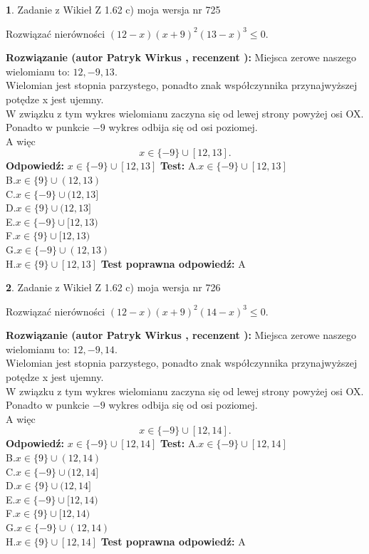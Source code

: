 \documentclass[12pt, a4paper]{article}
\theoremstyle{definition} %
\newtheorem{zad}{}
\newcommand{\zadStart}[1]{\begin{zad}#1\newline}
\newcommand{\zadStop}{\end{zad}}
\newcommand{\rozwStart}[2]{\noindent \textbf{Rozwiązanie (autor #1 , recenzent #2): }\newline}
\newcommand{\rozwStop}{\newline}
\newcommand{\odpStart}{\noindent \textbf{Odpowiedź:}\newline}
\newcommand{\odpStop}{\newline}
\newcommand{\testStart}{\noindent \textbf{Test:}\newline}
\newcommand{\testStop}{\newline}
\newcommand{\kluczStart}{\noindent \textbf{Test poprawna odpowiedź:}\newline}
\newcommand{\kluczStop}{\newline}
\begin{document}
\zadStart{Zadanie z Wikieł Z 1.62 c) moja wersja nr 725}

Rozwiązać nierówności $(12-x)(x+9)^{2}(13-x)^{3}\le0$.
\zadStop
\rozwStart{Patryk Wirkus}{}
Miejsca zerowe naszego wielomianu to: $12, -9, 13$.\\
Wielomian jest stopnia parzystego, ponadto znak współczynnika przy\linebreak najwyższej potędze x jest ujemny.\\ W związku z tym wykres wielomianu zaczyna się od lewej strony powyżej osi OX.\\
Ponadto w punkcie $-9$ wykres odbija się od osi poziomej.\\
A więc $$x \in \{-9\} \cup [12,13].$$
\rozwStop
\odpStart
$x \in \{-9\} \cup [12,13]$
\odpStop
\testStart
A.$x \in \{-9\} \cup [12,13]$\\
B.$x \in \{9\} \cup (12,13)$\\
C.$x \in \{-9\} \cup (12,13]$\\
D.$x \in \{9\} \cup (12,13]$\\
E.$x \in \{-9\} \cup [12,13)$\\
F.$x \in \{9\} \cup [12,13)$\\
G.$x \in \{-9\} \cup (12,13)$\\
H.$x \in \{9\} \cup [12,13]$
\testStop
\kluczStart
A
\kluczStop



\zadStart{Zadanie z Wikieł Z 1.62 c) moja wersja nr 726}

Rozwiązać nierówności $(12-x)(x+9)^{2}(14-x)^{3}\le0$.
\zadStop
\rozwStart{Patryk Wirkus}{}
Miejsca zerowe naszego wielomianu to: $12, -9, 14$.\\
Wielomian jest stopnia parzystego, ponadto znak współczynnika przy\linebreak najwyższej potędze x jest ujemny.\\ W związku z tym wykres wielomianu zaczyna się od lewej strony powyżej osi OX.\\
Ponadto w punkcie $-9$ wykres odbija się od osi poziomej.\\
A więc $$x \in \{-9\} \cup [12,14].$$
\rozwStop
\odpStart
$x \in \{-9\} \cup [12,14]$
\odpStop
\testStart
A.$x \in \{-9\} \cup [12,14]$\\
B.$x \in \{9\} \cup (12,14)$\\
C.$x \in \{-9\} \cup (12,14]$\\
D.$x \in \{9\} \cup (12,14]$\\
E.$x \in \{-9\} \cup [12,14)$\\
F.$x \in \{9\} \cup [12,14)$\\
G.$x \in \{-9\} \cup (12,14)$\\
H.$x \in \{9\} \cup [12,14]$
\testStop
\kluczStart
A
\kluczStop
\end{document}
